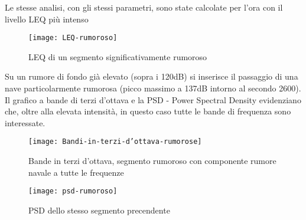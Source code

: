 Le stesse analisi, con gli stessi parametri, sono state calcolate per l’ora con il livello LEQ più intenso 

\begin{figure}[h]
\centering
\texttt{[image: LEQ-rumoroso]}
\caption{LEQ di un segmento significativamente rumoroso}
\end{figure}

Su un rumore di fondo già elevato (sopra i 120dB) si inserisce il passaggio di una nave particolarmente rumorosa (picco massimo a 137dB intorno al secondo 2600). 
Il grafico a bande di terzi d’ottava e la PSD - Power Spectral Density evidenziano che, oltre alla elevata intensità, in questo caso tutte le bande di frequenza sono interessate. 

\begin{figure}[h]
\centering
\texttt{[image: Bandi-in-terzi-d'ottava-rumorose]}
\caption{Bande in terzi d’ottava, segmento rumoroso con componente rumore navale a tutte le frequenze}
\end{figure}

\begin{figure}[h]
\centering
\texttt{[image: psd-rumoroso]}
\caption{PSD dello stesso segmento precendente}
\end{figure}















